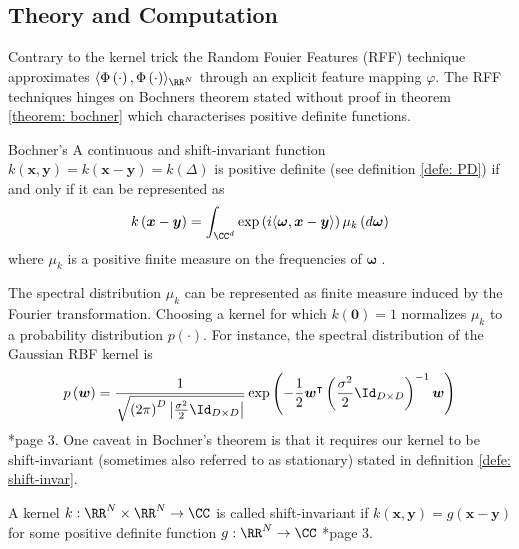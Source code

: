 \subsection{Theory and Computation}\label{Section3.1}
Contrary to the kernel trick the Random Fouier Features (RFF) technique approximates $\langle \Phi \left( \cdot \right) , \Phi \left( \cdot \right) \rangle_{\RR^N}$ through an explicit feature mapping $\varphi$. The RFF techniques hinges on Bochners theorem stated without proof in theorem \ref{theorem: bochner} which characterises positive definite functions.

\begin{thm}{Bochner's} \label{theorem: bochner}
    A continuous and shift-invariant function $k \left( \bm{x} , \bm{y} \right) = k \left( \bm{x} - \bm{y} \right) = k \left( \Delta \right)$ is positive definite (see definition \ref{defe: PD}) if and only if it can be represented as
    \[
        k \left( \bm{x} - \bm{y} \right) = \int_{\CC^d} \exp \left( i \langle \bm{\omega} , \bm{x} - \bm{y} \rangle \right) \mu_k \left( d \bm{\omega} \right)
    \]
    where $\mu_k$ is a positive finite measure on the frequencies of $\bm{\omega}$ \cite{HahnHans1933SBVü,LiuFanghui2021RFfK}.
\end{thm}

The spectral distribution $\mu_k$ can be represented as finite measure induced by the Fourier transformation. Choosing a kernel for which $k (\bm{0}) = 1$ normalizes $\mu_k$ to a probability distribution $p (\cdot)$. For instance, the spectral distribution of the Gaussian RBF kernel is
\begin{equation} \label{eq: rbf-spec-pdf}
    p \left( \bm{w}\right) = \frac{1}{\sqrt{\left( 2 \pi\right)^{D} \left| \frac{\sigma^2}{2} \Id_{D \times D} \right|}} \exp \left( -\frac{1}{2} \bm{w}^\intercal \left( \frac{\sigma^2}{2} \Id_{D \times D} \right)^{-1} \bm{w} \right)
\end{equation}
\cite{NIPS2007_013a006f}*{page 3}. One caveat in Bochner's theorem is that it requires our kernel to be shift-invariant (sometimes also referred to as stationary) stated in definition \ref{defe: shift-invar}.

\begin{defe} \label{defe: shift-invar}
    A kernel $k : \RR^N \times \RR^N \to \CC$ is called shift-invariant if $k \left( \bm{x}, \bm{y} \right) = g \left( \bm{x} - \bm{y} \right)$ for some positive definite function $g : \RR^N \to \CC$ \cite{JMLR:v17:14-538}*{page 3}.
\end{defe}


